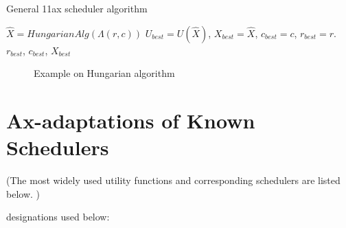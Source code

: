 \begin{algorithm}
	\caption{General 11ax scheduler algorithm}\label{alg:11ax}
	\begin{algorithmic}[1]
		\State $\hat X = HungarianAlg(\Lambda(r, c))$
		\State $U_{best} = U(\hat X)$,
		\State $X_{best} = \hat X$,
		\State $c_{best} = c$,
		\State $r_{best} = r$.
		\EndIf
		\EndFor
		\EndFor
		\State \Return $r_{best}$, $c_{best}$, $X_{best}$
		\EndProcedure
	\end{algorithmic}
\end{algorithm}

\begin{figure}[t]
\centering
\caption{\label{fig:matrixexm} Example on Hungarian algorithm}
\end{figure}

\section{Ax-adaptations of Known Schedulers}
\label{sec:adaptations}

(The most widely used utility functions and corresponding schedulers are listed below. )

designations used below:


